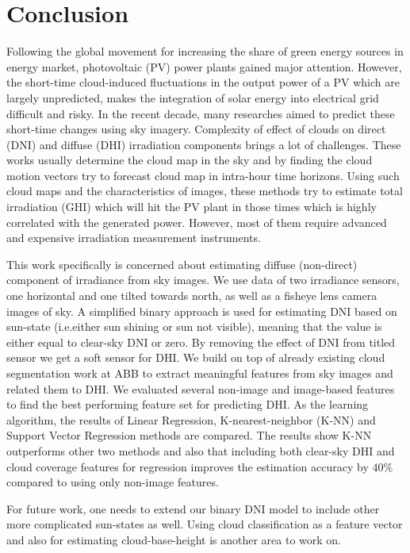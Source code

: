 \chapter{Conclusion}
\label{sec:conclusion_chapter}
Following the global movement for increasing the share of green energy sources in energy market, photovoltaic (PV) power plants gained major attention. However, the short-time cloud-induced fluctuations in the output power of a PV which are largely unpredicted, makes the integration of solar energy into electrical grid difficult and risky. In the recent decade, many researches aimed to predict these short-time changes using sky imagery. Complexity of effect of clouds on direct (DNI) and diffuse (DHI) irradiation components brings a lot of challenges. These works usually determine the cloud map in the sky and by finding the cloud motion vectors try to forecast cloud map in intra-hour time horizons. Using such cloud maps and the characteristics of images, these methods try to estimate total irradiation (GHI) which will hit the PV plant in those times which is highly correlated with the generated power. However, most of them require advanced and expensive irradiation measurement instruments.


This work specifically is concerned about estimating diffuse (non-direct) component of irradiance from sky images. We use data of two irradiance sensors, one horizontal and one tilted towards north, as well as a fisheye lens camera images of sky. A simplified binary approach is used for estimating DNI based on sun-state (i.e.either sun shining or sun not visible), meaning that the value is either equal to clear-sky DNI or zero. By removing the effect of DNI from titled sensor we get a soft sensor for DHI. We build on top of already existing cloud segmentation work at ABB to extract meaningful features from sky images and related them to DHI. We evaluated several non-image and image-based features to find the best performing feature set for predicting DHI. As the learning algorithm, the results of Linear Regression, K-nearest-neighbor (K-NN) and Support Vector Regression methods are compared. The results show K-NN outperforms other two methods and also that including both clear-sky DHI and cloud coverage features for regression improves the estimation accuracy by 40\% compared to using only non-image features. 


For future work, one needs to extend our binary DNI model to include other more complicated sun-states as well. Using cloud classification as a feature vector and also for estimating cloud-base-height is another area to work on.